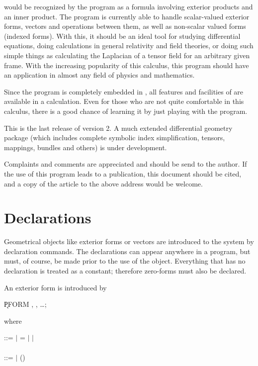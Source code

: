 would be recognized by the program as a formula involving exterior
products and an inner product.  The program is currently able to
handle scalar-valued exterior forms, vectors and operations between
them, as well as non-scalar valued forms (indexed forms).  With this,
it should be an ideal tool for studying differential equations,
doing calculations in general relativity and field theories, or doing
such simple things as calculating the Laplacian of a tensor field for
an arbitrary given frame.  With the increasing popularity of this
calculus, this program should have an application in almost any field
of physics and mathematics.

Since the program is completely embedded in {\REDUCE}, all features and
facilities of {\REDUCE} are available in a calculation.  Even for those
who are not quite comfortable in this calculus, there is a good chance
of learning it by just playing with the program.

This is the last release of version 2. A much extended differential
geometry package (which includes complete symbolic index simplification,
tensors, mappings, bundles and others) is under development.

Complaints and comments are appreciated and should be send to the author.
If the use of this program leads to a publication, this document should
be cited, and a copy of the article to the above address would be
welcome.

\section{Declarations}

Geometrical objects like exterior forms or vectors are introduced to the
system by declaration commands.  The declarations can appear anywhere in
a program, but must, of course, be made prior to the use of the object.
Everything that has no declaration is treated as a constant; therefore
zero-forms must also be declared.

An exterior form is introduced by\label{PFORM} 

\hspace*{2em} \k{PFORM} , , \ldots;

where

\begin{tabbing}
 ::=  $\mid$ = $\mid$   $\mid$ \\
 \\
 ::=  $\mid$ ()
\end{tabbing}

